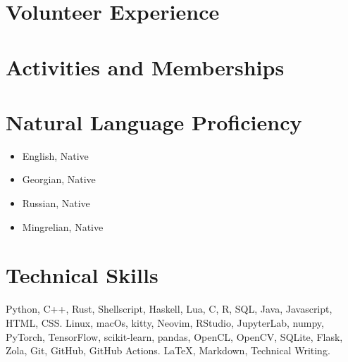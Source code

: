\documentclass[a4paper,10pt,sans]{moderncv}
\begin{document}
\section{Volunteer Experience}



\section{Activities and Memberships}



\section{Natural Language Proficiency}
\hspace*{\fill}
\begin{minipage}{\maincolumnwidth}
  \begin{multicols}{3}
    \begin{itemize}
      \item English, Native
      \item Georgian, Native
    \end{itemize}
    \columnbreak%
    \begin{itemize}
      \item Russian, Native
    \end{itemize}
    \columnbreak%
    \begin{itemize}
      \item Mingrelian, Native
    \end{itemize}
  \end{multicols}
\end{minipage}



\section{Technical Skills}
        {Python, C++, Rust, Shellscript, Haskell, Lua, C, R, SQL, Java, Javascript, HTML, CSS.}
        {Linux, macOs, kitty, Neovim, RStudio, JupyterLab, numpy, PyTorch, TensorFlow, scikit-learn,
         pandas, OpenCL, OpenCV, SQLite, Flask, Zola, Git, GitHub, GitHub Actions.}
        {\LaTeX, Markdown, Technical Writing.}
\end{document}
